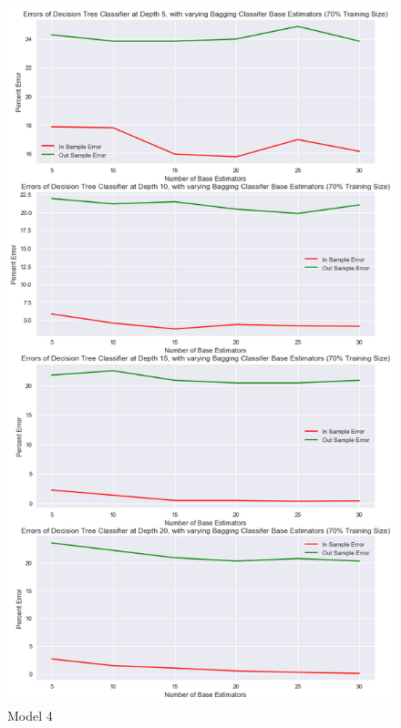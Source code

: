 \documentclass[10pt,twocolumn]{article}
\begin{document}
\begin{figure}[!t]
  \begin{center}
    \includegraphics[width=\textwidth,height=\textheight,keepaspectratio]{decision_tree_bagging.png}
  \end{center}

  \caption{\small Model 4}
  \label{fig-1}
\end{figure}
\end{document}
